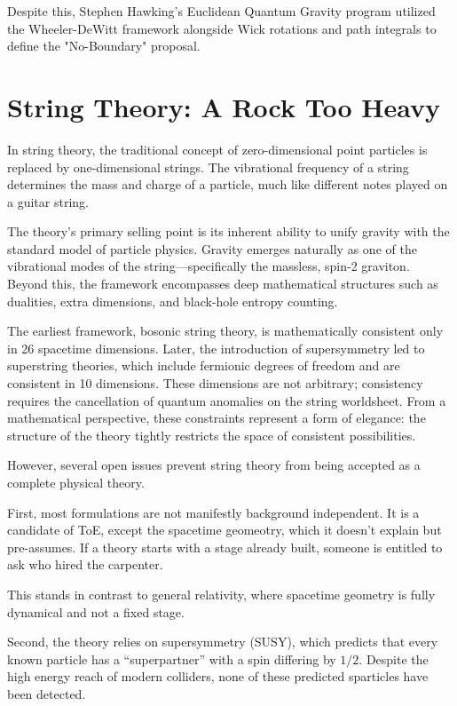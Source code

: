 Despite this, Stephen Hawking’s Euclidean Quantum Gravity program utilized the Wheeler-DeWitt framework alongside Wick rotations and path integrals to define the "No-Boundary" proposal.


\section{String Theory: A Rock Too Heavy}

In string theory, the traditional concept of zero-dimensional point particles is replaced by one-dimensional strings.
The vibrational frequency of a string determines the mass and charge of a particle, much like different notes played on a guitar string.

The theory's primary selling point is its inherent ability to unify gravity with the standard model of particle physics.
Gravity emerges naturally as one of the vibrational modes of the string—specifically the massless, spin-2 graviton.
Beyond this, the framework encompasses deep mathematical structures such as dualities, extra dimensions, and black-hole entropy counting.

The earliest framework, bosonic string theory, is mathematically consistent only in 26 spacetime dimensions.
Later, the introduction of supersymmetry led to superstring theories, which include fermionic degrees of freedom and are consistent in 10 dimensions.
These dimensions are not arbitrary; consistency requires the cancellation of quantum anomalies on the string worldsheet.
From a mathematical perspective, these constraints represent a form of elegance: the structure of the theory tightly restricts the space of consistent possibilities.

However, several open issues prevent string theory from being accepted as a complete physical theory.

First, most formulations are not manifestly background independent. It is a candidate of ToE, except the spacetime geomeotry, which
it doesn't explain but pre-assumes. If a theory starts with a stage already built, someone is entitled to ask who hired the carpenter.

This stands in contrast to general relativity, where spacetime geometry is fully dynamical and not a fixed stage.

Second, the theory relies on supersymmetry (SUSY), which predicts that every known particle has a ``superpartner'' with a spin differing by $1/2$.
Despite the high energy reach of modern colliders, none of these predicted sparticles have been detected.

